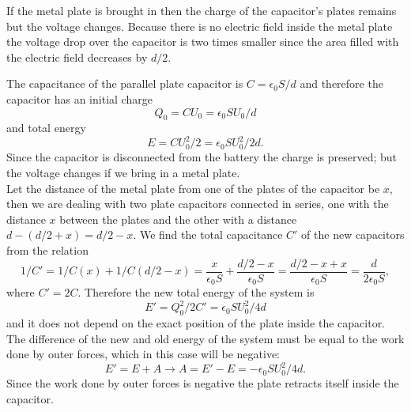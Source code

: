 \hinteng
If the metal plate is brought in then the charge of the capacitor's plates remains but the voltage changes. Because there is no electric field inside the metal plate the voltage drop over the capacitor is two times smaller since the area filled with the electric field decreases by $d/2$.

\solueng
The capacitance of the parallel plate capacitor is $C = \epsilon_0 S / d$ and therefore the capacitor has an initial charge
$$Q_0 = C U_0 = \epsilon_0 S U_0/ d$$ 
and total energy 
$$E = C U_0^2 / 2 = \epsilon_0 S U_0^2/ 2 d.$$ 
Since the capacitor is disconnected from the battery the charge is preserved; but the voltage changes if we bring in a metal plate.\\
Let the distance of the metal plate from one of the plates of the capacitor be $x$, then we are dealing with two plate capacitors connected in series, one with the distance $x$ between the plates and the other with a distance $d - (d/2 + x) = d/2 - x$. We find the total capacitance $C'$ of the new capacitors from the relation
$$1/C' = 1/C(x) + 1/C(d/2-x) = \frac{x}{\epsilon_0 S} + \frac{d/2 - x}{\epsilon_0 S} = \frac{d/2 - x + x}{\epsilon_0 S} = \frac{d}{2 \epsilon_0 S},$$ 
where $C' = 2C$. Therefore the new total energy of the system is
$$E' = Q_0^2 / 2C' = \epsilon_0 S U_0^2/ 4 d$$
and it does not depend on the exact position of the plate inside the capacitor. The difference of the new and old energy of the system must be equal to the work done by outer forces, which in this case will be negative:
$$E' = E + A \rightarrow A = E' - E = - \epsilon_0 S U_0^2/ 4 d.$$ 
Since the work done by outer forces is negative the plate retracts itself inside the capacitor.
\probend